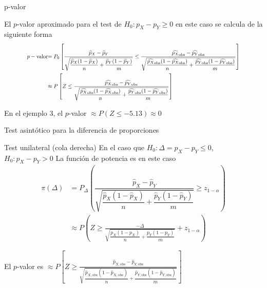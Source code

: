 \documentclass{beamer}
\theoremstyle{definition}
\newcommand\scalemath[2]{\scalebox{#1}{\mbox{\ensuremath{\displaystyle #2}}}}
\begin{document}
\begin{frame}{\color{rosee} p-valor}
    
El $p$-valor aproximado para el test de $H_0: p_X-p_Y \geq 0$ en este caso se calcula de la siguiente forma
$$
\begin{aligned}
\scalemath{0.75}{
p-\text {valor}} &\scalemath{0.75}{=P_{0}\left[\dfrac{\widehat{p}_X-\widehat{p}_Y}{\sqrt{\dfrac{\widehat{p}_X(1-\widehat{p}_X)}{n}+
         \dfrac{\widehat{p}_Y(1-\widehat{p}_Y)}{m}}} \leq \frac{\widehat{p_{X}}_{\text{obs}} -\widehat{p_{Y}}_{\text{obs}} }{\sqrt{\dfrac{\widehat{p_{X}}_{\text{obs}}(1-\widehat{p_{X}}_{\text{obs}})}{n}+
         \dfrac{\widehat{p_{Y}}_{\text{obs}}(1-\widehat{p_{Y}}_{\text{obs}})}{m}}}\right]} \\
&\scalemath{0.75}{\approx P\left[Z \leq \frac{\widehat{p_{X}}_{\text{obs}} -\widehat{p_{Y}}_{\text{obs}}}{\sqrt{\dfrac{\widehat{p_{X}}_{\text{obs}}(1-\widehat{p_{X}}_{\text{obs}})}{n}+
         \dfrac{\widehat{p_{Y}}_{\text{obs}}(1-\widehat{p_{Y}}_{\text{obs}})}{m}}}\right]}
\end{aligned}
$$

En el ejemplo 3, el $p$-valor $\approx P(Z\leq -5.13)\approx 0$
\end{frame}

\begin{frame}{\color{rosee} Test asint\'otico para la diferencia de proporciones} \small

\begin{block}{Test unilateral (cola derecha)}
  En el caso que $H_0: \Delta= p_X -p_Y \leq 0$,  $H_0: p_X- p_Y > 0$
    La funci\'on de potencia es en este caso
$$
\begin{aligned}
\pi(\Delta) &=P_{\Delta}\left(\dfrac{\widehat{p}_X-\widehat{p}_Y}{\sqrt{\dfrac{\widehat{p}_X(1-\widehat{p}_X)}{n}+\dfrac{\widehat{p}_Y(1-\widehat{p}_Y)}{m}}} \geq z_{1- \alpha}\right) \\
& \approx P\left(Z\geq \frac{-\Delta}{\sqrt{\dfrac{p_X(1-p_X)}{n}+\dfrac{p_Y(1-p_Y)}{m}}}+z_{1-\alpha}\right)
\end{aligned}
$$

\medskip

El $p$-valor es 
$\approx P\left[Z\geq \frac{\widehat{p}_{X,\text{obs}}-\widehat{p}_{Y,\text{obs}}}{\sqrt{\dfrac{\widehat{p}_{X,\text{obs}}(1-\widehat{p}_{X,\text{obs}})}{n}+
         \dfrac{\widehat{p}_{Y,\text{obs}}(1-\widehat{p}_{Y,\text{obs}})}{m}}}\right]$
\end{block}
\end{frame}
\end{document}
